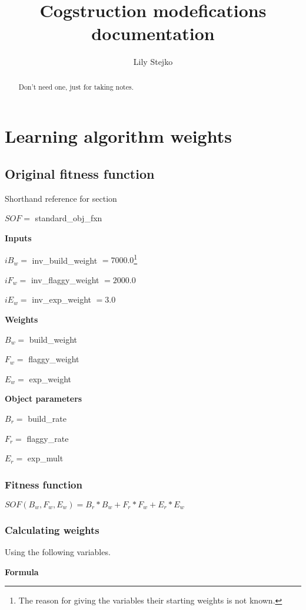 \documentclass[12pt, letterpaper]{article}
\title{Cogstruction modefications documentation}
\author{Lily Stejko}
\begin{document}
\maketitle

\begin{abstract}
Don't need one, just for taking notes.
\end{abstract}

\section{Learning algorithm weights}

\subsection{Original fitness function}

Shorthand reference for section

$SOF =$ standard\_obj\_fxn

\textbf{Inputs}  

$iB_w =$ inv\_build\_weight $= 7000.0$\footnote[1]{The reason for giving the variables their starting weights is not known.}

$iF_w =$ inv\_flaggy\_weight $= 2000.0$\footnotemark[1]

$iE_w =$ inv\_exp\_weight $= 3.0$\footnotemark[1]

\textbf{Weights}

$B_w =$ build\_weight

$F_w =$ flaggy\_weight

$E_w =$ exp\_weight

\textbf{Object parameters}

$B_r =$ build\_rate

$F_r =$ flaggy\_rate

$E_r =$ exp\_mult

\subsubsection{Fitness function}

$SOF(B_w,F_w,E_w) = B_r*B_w+F_r*F_w+E_r*E_w$

\subsubsection{Calculating weights}

Using the following variables.

\textbf{Formula}
\end{document}
